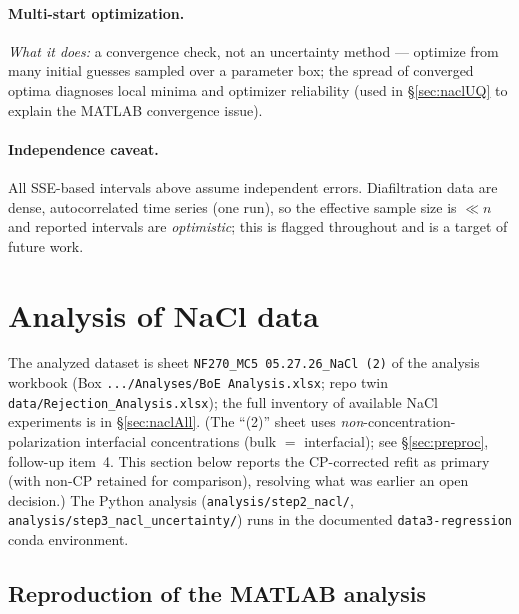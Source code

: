 \documentclass[11pt]{article}
\newcommand{\note}[1]{{\color{blue}\textsf{(#1)}}}
\begin{document}
\paragraph{Multi-start optimization.} \emph{What it does:} a convergence
check, not an uncertainty method --- optimize from many initial guesses sampled
over a parameter box; the spread of converged optima diagnoses local minima and
optimizer reliability (used in \S\ref{sec:naclUQ} to explain the MATLAB
convergence issue).

\paragraph{Independence caveat.} All SSE-based intervals above assume independent
errors. Diafiltration data are dense, autocorrelated time series (one run), so
the effective sample size is $\ll n$ and reported intervals are
\emph{optimistic}; this is flagged throughout and is a target of future work.

\section{Analysis of NaCl data}\label{sec:nacl}
The analyzed dataset is sheet \texttt{NF270\_MC5 05.27.26\_NaCl (2)} of the
analysis workbook \cite{boeAnalysisWorkbook} (Box \texttt{.../Analyses/BoE
Analysis.xlsx}; repo twin \texttt{data/Rejection\_Analysis.xlsx}); the full
inventory of
available NaCl experiments is in \S\ref{sec:naclAll}.
\note{The ``(2)'' sheet uses \emph{non}-concentration-polarization interfacial
concentrations (bulk $=$ interfacial); see \S\ref{sec:preproc}, follow-up
item~4. This section below reports the CP-corrected refit as primary (with
non-CP retained for comparison), resolving what was earlier an open
decision.}
The Python analysis
(\texttt{analysis/step2\_nacl/}, \texttt{analysis/step3\_nacl\_uncertainty/}) runs
in the documented \texttt{data3-regression} conda environment.

\subsection{Reproduction of the MATLAB analysis}\label{sec:reproMATLAB}
\end{document}
